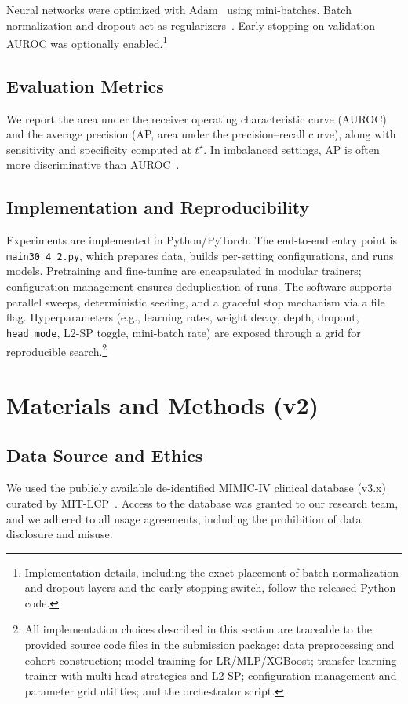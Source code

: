 \documentclass[journal,article,submit,pdftex,moreauthors]{Definitions/mdpi}
\begin{document}
Neural networks were optimized with Adam~\citep{Kingma2015_Adam} using mini-batches. Batch normalization and dropout act as regularizers~\citep{Ioffe2015_BN,Srivastava2014_Dropout}. Early stopping on validation AUROC was optionally enabled.\footnote{Implementation details, including the exact placement of batch normalization and dropout layers and the early-stopping switch, follow the released Python code.}

\subsection{Evaluation Metrics}

We report the area under the receiver operating characteristic curve (AUROC) and the average precision (AP, area under the precision--recall curve), along with sensitivity and specificity computed at $t^\star$. In imbalanced settings, AP is often more discriminative than AUROC~\citep{Saito2015_PR}.

\subsection{Implementation and Reproducibility}

Experiments are implemented in Python/PyTorch. The end-to-end entry point is \texttt{main30\_4\_2.py}, which prepares data, builds per-setting configurations, and runs models. Pretraining and fine-tuning are encapsulated in modular trainers; configuration management ensures deduplication of runs. The software supports parallel sweeps, deterministic seeding, and a graceful stop mechanism via a file flag. Hyperparameters (e.g., learning rates, weight decay, depth, dropout, \texttt{head\_mode}, L2-SP toggle, mini-batch rate) are exposed through a grid for reproducible search.\footnote{All implementation choices described in this section are traceable to the provided source code files in the submission package: data preprocessing and cohort construction; model training for LR/MLP/XGBoost; transfer-learning trainer with multi-head strategies and L2-SP; configuration management and parameter grid utilities; and the orchestrator script.}



\section{Materials and Methods (v2)}

\subsection{Data Source and Ethics}
We used the publicly available de-identified MIMIC-IV clinical database (v3.x) curated by MIT-LCP~\citep{Johnson2023_MIMICIV}.
Access to the database was granted to our research team, and we adhered to all usage agreements, including the prohibition of data disclosure and misuse.
\end{document}
